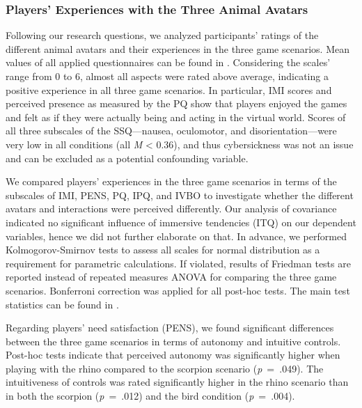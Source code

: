 \documentclass{sigchi}
\begin{document}
\subsubsection{Players' Experiences with the Three Animal Avatars} %
Following our research questions, we analyzed participants' ratings of the different animal avatars and their experiences in the three game scenarios.
Mean values of all applied questionnaires can be found in . 
Considering the scales' range from 0 to 6, almost all aspects were rated above average, indicating a positive experience in all three game scenarios. In particular, IMI scores and perceived presence as measured by the PQ show that players enjoyed the games and felt as if they were actually being and acting in the virtual world.
Scores of all three subscales of the SSQ---nausea, oculomotor, and disorientation---were very low in all conditions (all \textit{M} < 0.36), and thus cybersickness was not an issue and can be excluded as a potential confounding variable. 


We compared players' experiences in the three game scenarios in terms of the subscales of IMI, PENS, PQ, IPQ, and IVBO to investigate whether the different avatars and interactions were perceived differently. Our analysis of covariance indicated no significant influence of immersive tendencies (ITQ) on our dependent variables, hence we did not further elaborate on that. In advance, we performed Kolmogorov-Smirnov tests to assess all scales for normal distribution as a requirement for parametric calculations. If violated, results of Friedman tests are reported instead of repeated measures ANOVA for comparing the three game scenarios. Bonferroni correction was applied for all post-hoc tests. The main test statistics can be found in . 

Regarding players' need satisfaction (PENS), we found significant differences between the three game scenarios in terms of autonomy and intuitive controls. Post-hoc tests indicate that perceived autonomy was significantly higher when playing with the rhino compared to the scorpion scenario (\textit{p}~=~.049). %
The intuitiveness of controls was rated significantly higher in the rhino scenario than in both the scorpion (\textit{p}~=~.012) and the bird condition (\textit{p}~=~.004). %
\end{document}
